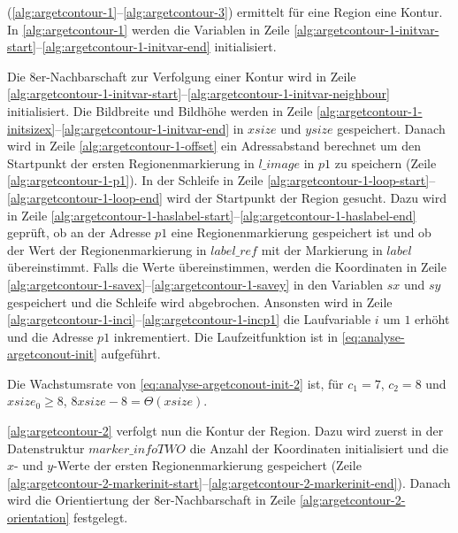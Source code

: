  (\autoref{alg:argetcontour-1}--\autoref{alg:argetcontour-3}) ermittelt für eine Region eine
 Kontur. In \autoref{alg:argetcontour-1} werden die Variablen in Zeile
 \ref{alg:argetcontour-1-initvar-start}--\ref{alg:argetcontour-1-initvar-end} initialisiert.

Die 8er-Nachbarschaft zur Verfolgung einer Kontur wird in Zeile
 \ref{alg:argetcontour-1-initvar-start}--\ref{alg:argetcontour-1-initvar-neighbour} initialisiert. Die Bildbreite und
 Bildhöhe werden in Zeile \ref{alg:argetcontour-1-initsizex}--\ref{alg:argetcontour-1-initvar-end} in $\mathit{xsize}$
 und $\mathit{ysize}$ gespeichert. Danach wird in Zeile \ref{alg:argetcontour-1-offset} ein Adressabstand berechnet um
 den Startpunkt der ersten Regionenmarkierung in $\mathit{l\_image}$ in $\mathit{p1}$ zu speichern (Zeile
 \ref{alg:argetcontour-1-p1}). In der Schleife in Zeile
 \ref{alg:argetcontour-1-loop-start}--\ref{alg:argetcontour-1-loop-end} wird der Startpunkt der Region gesucht. Dazu
 wird in Zeile \ref{alg:argetcontour-1-haslabel-start}--\ref{alg:argetcontour-1-haslabel-end} geprüft, ob an der
 Adresse $\mathit{p1}$ eine Regionenmarkierung gespeichert ist und ob der Wert der Regionenmarkierung in
 $\mathit{label\_ref}$ mit der Markierung in $\mathit{label}$ übereinstimmt. Falls die Werte übereinstimmen, werden die
 Koordinaten in Zeile \ref{alg:argetcontour-1-savex}--\ref{alg:argetcontour-1-savey} in den Variablen $\mathit{sx}$ und
 $\mathit{sy}$ gespeichert und die Schleife wird abgebrochen. Ansonsten wird in Zeile
 \ref{alg:argetcontour-1-inci}--\ref{alg:argetcontour-1-incp1} die Laufvariable $i$ um $1$ erhöht und die Adresse
 $\mathit{p1}$ inkrementiert. Die Laufzeitfunktion ist in \autoref{eq:analyse-argetconout-init} aufgeführt.

Die Wachstumsrate von \autoref{eq:analyse-argetconout-init-2} ist, für $c_{1} = 7$, $c_{2} = 8$ und $\mathit{xsize}_0
 \geq 8$, $8\mathit{xsize} - 8 = \Theta(\mathit{xsize})$.

\autoref{alg:argetcontour-2} verfolgt nun die Kontur der Region. Dazu wird zuerst in der Datenstruktur
 $\mathit{marker\_infoTWO}$ die Anzahl der Koordinaten initialisiert und die $x$- und $y$-Werte der ersten
 Regionenmarkierung gespeichert (Zeile
 \ref{alg:argetcontour-2-markerinit-start}--\ref{alg:argetcontour-2-markerinit-end}). Danach wird die Orientiertung der
 8er-Nachbarschaft in Zeile \ref{alg:argetcontour-2-orientation} festgelegt.



